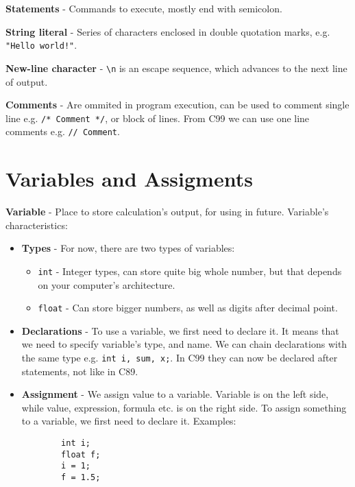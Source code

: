 \documentclass[openany]{book}
\begin{document}
    \textbf{Statements} - Commands to execute, mostly end with semicolon.

    \bigskip
    \textbf{String literal} - Series of characters enclosed in double quotation marks,
    e.g. \texttt{"Hello world!"}.

    \textbf{New-line character} - \texttt{\textbackslash n} is an escape sequence, which
    advances to the next line of output.

    \textbf{Comments} - Are ommited in program execution, can be used to comment single line
    e.g. \texttt{/* Comment */}, or block of lines. From C99 we can use one line comments
    e.g. \texttt{// Comment}.

    \section{Variables and Assigments}

    \textbf{Variable} - Place to store calculation's output, for using in future.
    Variable's characteristics:
    \begin{itemize}
        \item 
        \textbf{Types} - For now, there are two types of variables:
        \begin{itemize}
            \item \texttt{int} - Integer types, can store quite big whole number, but
            that depends on your computer's architecture.
            \item \texttt{float} - Can store bigger numbers, as well as digits after
            decimal point.
        \end{itemize}

        \item 
        \textbf{Declarations} - To use a variable, we first need to declare it. It
        means that we need to specify variable's type, and name. We can chain declarations
        with the same type e.g. \texttt{int i, sum, x;}. In C99 they can now be declared
        after statements, not like in C89.
        
        \item
        \textbf{Assignment} - We assign value to a variable. Variable is on the left
        side, while value, expression, formula etc. is on the right side. To assign
        something to a variable, we first need to declare it. Examples:
        \begin{lstlisting}
        int i;
        float f;
        i = 1;
        f = 1.5;
        \end{lstlisting}
    \end{itemize}
\end{document}
